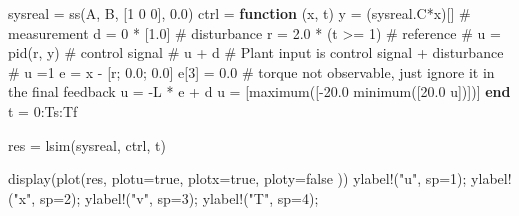 \documentclass[
  a4paper,
  DIV=11,
  numbers=noendperiod]{scrreprt}
\newenvironment{Shaded}{\begin{snugshade}}{\end{snugshade}}
\newcommand{\CommentTok}[1]{\textcolor[rgb]{0.37,0.37,0.37}{#1}}
\newcommand{\ConstantTok}[1]{\textcolor[rgb]{0.56,0.35,0.01}{#1}}
\newcommand{\FloatTok}[1]{\textcolor[rgb]{0.68,0.00,0.00}{#1}}
\newcommand{\FunctionTok}[1]{\textcolor[rgb]{0.28,0.35,0.67}{#1}}
\newcommand{\KeywordTok}[1]{\textcolor[rgb]{0.00,0.23,0.31}{\textbf{#1}}}
\newcommand{\NormalTok}[1]{\textcolor[rgb]{0.00,0.23,0.31}{#1}}
\newcommand{\OperatorTok}[1]{\textcolor[rgb]{0.37,0.37,0.37}{#1}}
\newcommand{\StringTok}[1]{\textcolor[rgb]{0.13,0.47,0.30}{#1}}
\begin{document}
\begin{Shaded}
\begin{Highlighting}[]
\NormalTok{sysreal }\OperatorTok{=} \FunctionTok{ss}\NormalTok{(A, B, [}\FloatTok{1} \FloatTok{0} \FloatTok{0}\NormalTok{], }\FloatTok{0.0}\NormalTok{)}
\NormalTok{ctrl }\OperatorTok{=} \KeywordTok{function}\NormalTok{ (x, t)}
\NormalTok{    y }\OperatorTok{=}\NormalTok{ (sysreal.C}\OperatorTok{*}\NormalTok{x)[] }\CommentTok{\# measurement}
\NormalTok{    d }\OperatorTok{=} \FloatTok{0} \OperatorTok{*}\NormalTok{ [}\FloatTok{1.0}\NormalTok{]        }\CommentTok{\# disturbance}
\NormalTok{    r }\OperatorTok{=} \FloatTok{2.0} \OperatorTok{*}\NormalTok{ (t }\OperatorTok{\textgreater{}=} \FloatTok{1}\NormalTok{) }\CommentTok{\# reference}
    \CommentTok{\# u = pid(r, y) \# control signal}
    \CommentTok{\# u + d \# Plant input is control signal + disturbance}
    \CommentTok{\# u =1}
    \ConstantTok{e} \OperatorTok{=}\NormalTok{ x }\OperatorTok{{-}}\NormalTok{ [r; }\FloatTok{0.0}\NormalTok{; }\FloatTok{0.0}\NormalTok{]}
    \ConstantTok{e}\NormalTok{[}\FloatTok{3}\NormalTok{] }\OperatorTok{=} \FloatTok{0.0} \CommentTok{\# torque not observable, just ignore it in the final feedback}
\NormalTok{    u }\OperatorTok{=} \OperatorTok{{-}}\NormalTok{L }\OperatorTok{*} \ConstantTok{e} \OperatorTok{+}\NormalTok{ d}
\NormalTok{    u }\OperatorTok{=}\NormalTok{ [}\FunctionTok{maximum}\NormalTok{([}\OperatorTok{{-}}\FloatTok{20.0} \FunctionTok{minimum}\NormalTok{([}\FloatTok{20.0}\NormalTok{ u])])]}
\KeywordTok{end}
\NormalTok{t }\OperatorTok{=} \FloatTok{0}\OperatorTok{:}\NormalTok{Ts}\OperatorTok{:}\NormalTok{Tf}

\NormalTok{res }\OperatorTok{=} \FunctionTok{lsim}\NormalTok{(sysreal, ctrl, t)}

\FunctionTok{display}\NormalTok{(}\FunctionTok{plot}\NormalTok{(res, }
\NormalTok{    plotu}\OperatorTok{=}\ConstantTok{true}\NormalTok{, }
\NormalTok{    plotx}\OperatorTok{=}\ConstantTok{true}\NormalTok{, }
\NormalTok{    ploty}\OperatorTok{=}\ConstantTok{false}
\NormalTok{    ))}
\FunctionTok{ylabel!}\NormalTok{(}\StringTok{"u"}\NormalTok{, sp}\OperatorTok{=}\FloatTok{1}\NormalTok{);}
\FunctionTok{ylabel!}\NormalTok{(}\StringTok{"x"}\NormalTok{, sp}\OperatorTok{=}\FloatTok{2}\NormalTok{);}
\FunctionTok{ylabel!}\NormalTok{(}\StringTok{"v"}\NormalTok{, sp}\OperatorTok{=}\FloatTok{3}\NormalTok{);}
\FunctionTok{ylabel!}\NormalTok{(}\StringTok{"T"}\NormalTok{, sp}\OperatorTok{=}\FloatTok{4}\NormalTok{);}
\end{Highlighting}
\end{Shaded}
\end{document}
